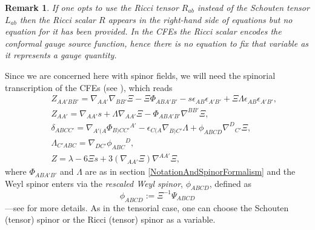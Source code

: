 \documentclass[10pt,a4paper]{article}
\theoremstyle{plain}
\newtheorem{remark}{Remark}
\begin{document}
 \begin{remark}
   \emph{ If one opts to use the Ricci tensor $R_{ab}$ instead of the
     Schouten tensor $L_{ab}$ then the Ricci scalar $R$ appears in the
     right-hand side of equations but no equation for it has been
     provided.  In the CFEs the Ricci scalar encodes the
     \emph{conformal gauge source function}, hence there is no
     equation to fix that variable as it represents a gauge quantity.}
 \end{remark}

\noindent Since we are concerned here with spinor fields, we will need
the spinorial transcription of the CFEs (see \cite{CFEbook}), which reads
\begin{subequations}
\begin{eqnarray}
   && Z_{AA'BB'} = \nabla_{AA'}\nabla_{BB'}\Xi - \Xi \Phi _{ABA'B'} -
  s \epsilon _{AB} \epsilon _{A'B'} + \Xi \Lambda \epsilon _{AB}
  \epsilon _{A'B'} ,
  \label{Def_ConfFactor_CFE_zeroquant}\\
  && Z_{AA'} = \nabla_{AA'}s + \Lambda \nabla_{AA'}\Xi - \Phi
  _{ABA'B'} \nabla^{BB'}\Xi ,\label{Def_s_CFE_zeroquant}\\ &&
  \delta_{ABCC'} = \nabla_{A'(A}\Phi _{B)CC'}{}^{A'} - \epsilon _{C(A}
  \nabla_{B)C'}\Lambda + \phi _{ABCD} \nabla^{D}{}_{C'}\Xi
  ,\label{Def_delta_CFE_zeroquant} \\ && \Lambda _{C'ABC} =
  \nabla_{DC'}\phi _{ABC}{}^{D}, \label{Def_Lambda_CFE_zeroquant}\\ &&
  Z = \lambda -6 \Xi s + 3 (\nabla_{AA'}\Xi)
  \nabla^{AA'}\Xi, \label{Def_cons_CFE_zeroquant}
\end{eqnarray}
\end{subequations}
where $\Phi_{ABA'B'}$ and $\Lambda$ are as in section \ref{NotationAndSpinorFormalism} and the Weyl spinor enters via
the \emph{rescaled Weyl spinor}, $\phi_{ABCD}$, defined as
\begin{equation}\label{Def_rescaled_Weyl_spinor}
\phi_{ABCD} := \Xi^{-1} \Psi_{ABCD}
\end{equation}
---see \cite{Ste91, PenRin84} for more details.  As in the tensorial case, one
can choose the Schouten (tensor) spinor or the Ricci (tensor) spinor
as a variable.  
\end{document}
